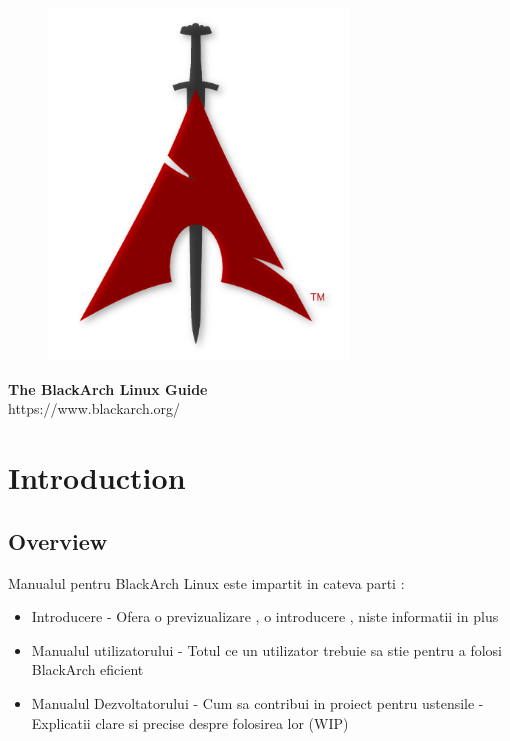 \documentclass[a4paper, oneside, 11pt]{book}
\begin{document}
\pagestyle{empty}
\begin{center}
\begin{figure}[htbp]
\centering
\vspace{0.5cm}
\includegraphics[width=8cm]{images/logo.png}
\label{fig:logo}
\end{figure}
\vspace{0.5cm}
\Huge{\textbf{The BlackArch Linux Guide}}\\
\vspace{1cm}
\Large{\color{red}https://www.blackarch.org/}\\
\vspace{0.5cm}
\end{center}
\newpage
\tableofcontents
\newpage
\pagestyle{fancy}


\chapter{Introduction}

\section{Overview}
Manualul pentru BlackArch Linux este impartit in cateva parti :
\begin{itemize}
\item Introducere - Ofera o previzualizare , o introducere , niste informatii in plus 
\item Manualul utilizatorului - Totul ce un utilizator trebuie sa stie pentru a folosi BlackArch eficient
\item Manualul Dezvoltatorului - Cum sa contribui in proiect
\Manualul pentru ustensile  - Explicatii clare si precise despre folosirea lor (WIP)
\end{itemize}
\end{document}
